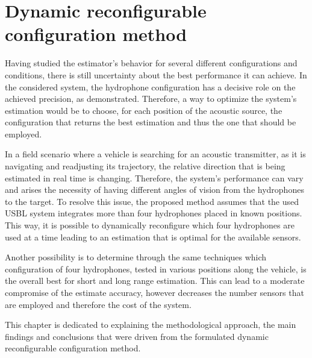 \chapter{Dynamic reconfigurable configuration method}  \label{chap:study}

Having studied the estimator's behavior for several different configurations and conditions, there is still uncertainty about the best performance it can achieve. In the considered system, the hydrophone configuration has a decisive role on the achieved precision, as demonstrated. Therefore, a way to optimize the system's estimation would be to choose, for each position of the acoustic source, the configuration that returns the best estimation and thus the one that should be employed.

In a field scenario where a vehicle is searching for an acoustic transmitter, as it is navigating and readjusting its trajectory, the relative direction that is being estimated in real time is changing. Therefore, the system's performance can vary and arises the necessity of having different angles of vision from the hydrophones to the target. To resolve this issue, the proposed method assumes that the used USBL system integrates more than four hydrophones placed in known positions. This way, it is possible to dynamically reconfigure which four hydrophones are used at a time leading to an estimation that is optimal for the available sensors. 

Another possibility is to determine through the same techniques which configuration of four hydrophones, tested in various positions along the vehicle, is the overall best for short and long range estimation. This can lead to a moderate compromise of the estimate accuracy, however decreases the number sensors that are employed and therefore the cost of the system.

This chapter is dedicated to explaining the methodological approach, the main findings and conclusions that were driven from the formulated dynamic reconfigurable configuration method.



